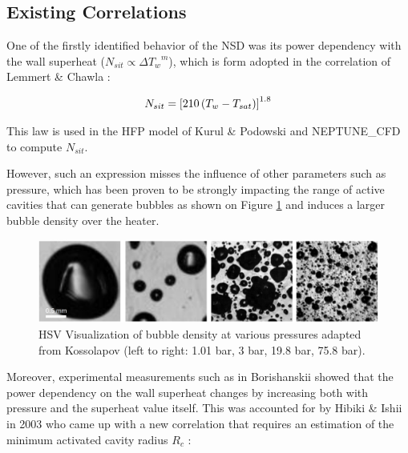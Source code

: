 \subsection{Existing Correlations}

One of the firstly identified behavior of the NSD was its power dependency with the wall superheat ($N_{sit} \propto {\Delta T_{w}}^{m}$), which is form adopted in the correlation of Lemmert \& Chawla \cite{lemmert_influence_1977} : 

\begin{align}
N_{sit}=\left[ 210\left( T_{w}-T_{sat} \right) \right]^{1.8}
\label{eq:nsit_lemmert}
\end{align}

\begin{note*}{}
This law is used in the HFP model of Kurul \& Podowski and NEPTUNE\_CFD to compute $N_{sit}$.
\end{note*}

However, such an expression misses the influence of other parameters such as pressure, which has been proven to be strongly impacting the range of active cavities that can generate bubbles as shown on Figure \ref{fig:nsd_P_koss} and induces a larger bubble density over the heater. 

\begin{figure}[h!]
\centering
\includegraphics[width=0.7\linewidth]{img/NSD/nsd_press_koss.png}
\caption{HSV Visualization of bubble density at various pressures adapted from Kossolapov \cite{kossolapov_experimental_2021} (left to right: 1.01 bar, 3 bar, 19.8 bar, 75.8 bar). }
\label{fig:nsd_P_koss}
\end{figure}

\npar

Moreover, experimental measurements such as in Borishanskii \cite{borishanskii_heat_1969} showed that the power dependency on the wall superheat changes by increasing both with pressure and the superheat value itself. This was accounted for by Hibiki \& Ishii in 2003 \cite{hibiki_active_2003} who came up with a new correlation that requires an estimation of the minimum activated cavity radius $R_{c}$ : 


